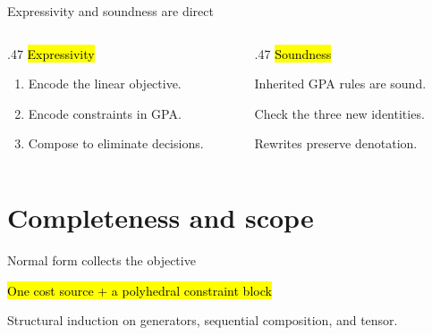 \documentclass[aspectratio=169,12pt]{beamer}
\begin{document}
\begin{frame}[t]{Expressivity and soundness are direct}
\begin{columns}[T,onlytextwidth]
\begin{column}{.47\textwidth}
\hl{Expressivity}\par
\vspace{4mm}
\begin{enumerate}
\item Encode the linear objective.
\item Encode constraints in GPA.
\item Compose to eliminate decisions.
\end{enumerate}
\end{column}
\begin{column}{.47\textwidth}
\hl{Soundness}\par
\vspace{4mm}
Inherited GPA rules are sound.\par
\vspace{2mm}
Check the three new identities.\par
\vspace{2mm}
Rewrites preserve denotation.
\end{column}
\end{columns}
\end{frame}

\section{Completeness and scope}

\begin{frame}[t]{Normal form collects the objective}
\centering
\vspace{2mm}
\resizebox{.78\linewidth}{!}{}\par
\vspace{4mm}
\hl{One cost source + a polyhedral constraint block}\par
\vspace{3mm}
{\small Structural induction on generators, sequential composition, and tensor.}
\end{frame}
\end{document}
